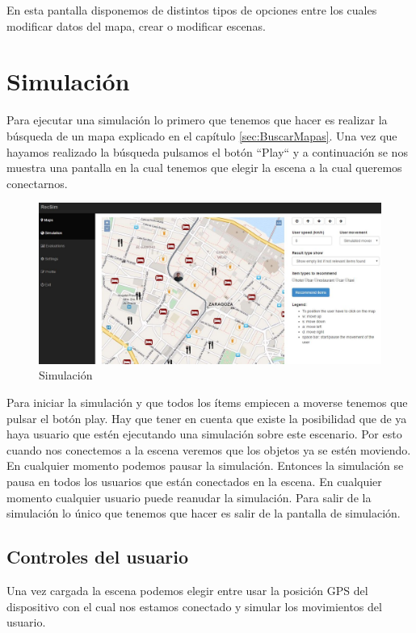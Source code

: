 En esta pantalla disponemos de distintos tipos de opciones entre los cuales modificar datos del mapa, crear o modificar escenas.

\section{Simulación}

Para ejecutar una simulación lo primero que tenemos que hacer es realizar la búsqueda de un mapa explicado en el capítulo \ref{sec:BuscarMapas}. Una vez que hayamos realizado la búsqueda pulsamos el botón ``Play`` y a continuación se nos muestra una pantalla en la cual tenemos que elegir la escena a la cual queremos conectarnos.

\begin{figure}[H]
	\centering\includegraphics[scale=0.35]{imagenes/capitulo11/capitulo11.jpg}
	\caption{Simulación}
	\label{img:Simulation}
\end{figure}

Para iniciar la simulación y que todos los ítems empiecen a moverse tenemos que pulsar el botón play. Hay que tener en cuenta que existe la posibilidad que de ya haya usuario que estén ejecutando una simulación sobre este escenario. Por esto cuando nos conectemos a la escena veremos que los objetos ya se estén moviendo. En cualquier momento podemos pausar la simulación. Entonces la simulación se pausa en todos los usuarios que están conectados en la escena. En cualquier momento cualquier usuario puede reanudar la simulación. Para salir de la simulación lo único que tenemos que hacer es salir de la pantalla de simulación.

\subsection{Controles del usuario}

Una vez cargada la escena podemos elegir entre usar la posición GPS del dispositivo con el cual nos estamos conectado y simular los movimientos del usuario.

